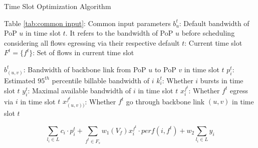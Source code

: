 \begin{algorithm}
	\caption{Time Slot Optimization Algorithm}
	\label{alg3}
	\begin{algorithmic}
		\renewcommand{\algorithmicrequire}{ \textbf{Inputs:}}
		\REQUIRE 
		\STATE Table \ref{tab:common input}: Common input parameters
            \STATE $b^t_u$: Default bandwidth of PoP $u$ in time slot $t$. It refers to the bandwidth of PoP $u$ before scheduling considering all flows egressing via their respective default {\egress} 
            \STATE $t$: Current time slot
            \STATE $F^t=\{f^t\}$: Set of flows in current time slot
            
            
		
		\renewcommand{\algorithmicensure}{ \textbf{Outputs:}}
		\ENSURE 
            
            \STATE $b^t_{(u,v)}$: Bandwidth of backbone link from PoP $u$ to PoP $v$ in time slot $t$
            \STATE $p_i^t$: Estimated $95^{th}$ percentile billable bandwidth of {\egress} $i$
            \STATE $k_{i}^t$: Whether {\egress} $i$ bursts in time slot $t$ 
            \STATE $y_i^t$: Maximal available bandwidth of {\egress} $i$ in time slot $t$
            \STATE $x_{i}^{f^{t}}$: Whether $f^t$ egress via {\egress} $i$  in time slot $t$ 
            \STATE $x_{(u,v))}^{f^{t}}$: Whether $f^t$ go through backbone link $(u,v)$  in time slot $t$ 
		
		\renewcommand{\algorithmicensure}{ \textbf{Minimize:}}
		\ENSURE
		$$\sum_{l_i \in L} c_i \cdot p_i^t+\sum_{f^t \in F_s} w_1\left(V_f\right) x_i^{f^t}          \cdot perf(i, f^t) +w_2 \sum_{l_i \in L} y_i $$


\end{algorithmic}
\end{algorithm}
